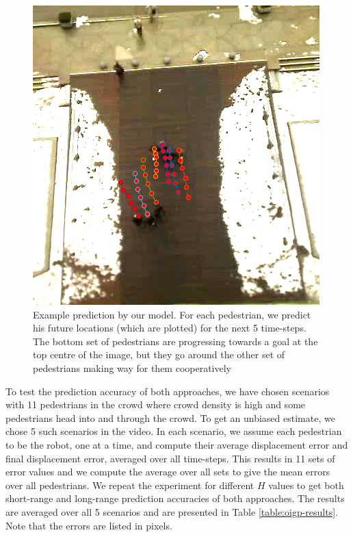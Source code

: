 \begin{figure}[t!]
  \centering
  \includegraphics[scale=0.35]{Figures/igp2-crop.png}
  \caption{Example prediction by our model. For each pedestrian, we predict his future locations (which are plotted) for the next 5 time-steps. The bottom set of pedestrians are progressing towards a goal at the top centre of the image, but they go around the other set of pedestrians making way for them cooperatively}
  \label{fig:oigp-bestcase}
\end{figure}

To test the prediction accuracy of both approaches, we have chosen scenarios with 11 pedestrians in the crowd where crowd density is high and some pedestrians head into and through the crowd. To get an unbiased estimate, we chose 5 such scenarios in the video. In each scenario, we assume each pedestrian to be the robot, one at a time, and compute their average displacement error and final displacement error, averaged over all time-steps. This results in 11 sets of error values and we compute the average over all sets to give the mean errors over all pedestrians. We repeat the experiment for different $H$ values to get both short-range and long-range prediction accuracies of both approaches. The results are averaged over all 5 scenarios and are presented in Table \ref{table:oigp-results}. Note that the errors are listed in pixels.

